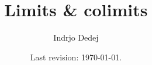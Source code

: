 




\title{Limits \& colimits}
\author{Indrjo Dedej}
\date{Last revision: \today{}.}



\maketitle

\tableofcontents

%






